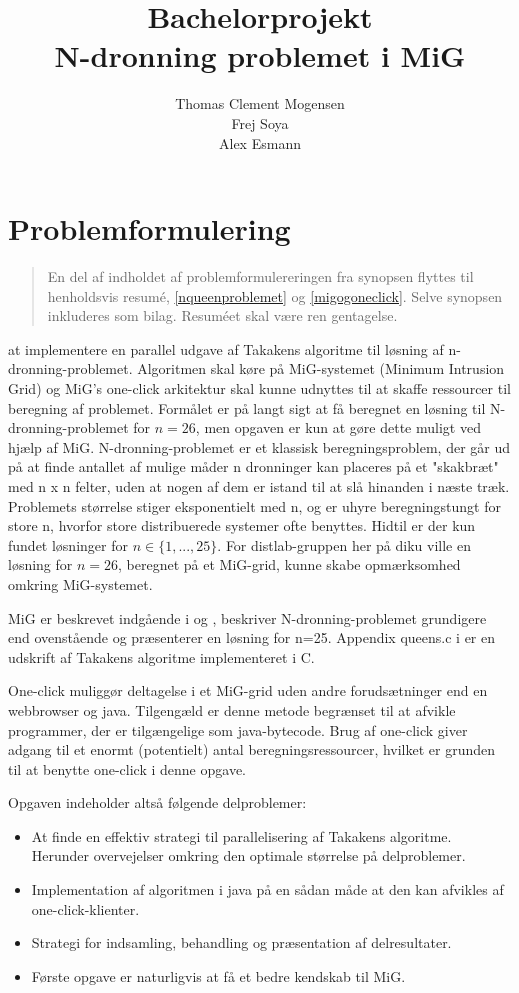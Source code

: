 \documentclass[a4,10pt]{article}
\title{Bachelorprojekt\\N-dronning problemet i MiG}
\author{Thomas Clement Mogensen \\ Frej Soya \\ Alex Esmann }
\begin{document}
\maketitle
\tableofcontents

\tableofcontents

\abstract{}

\section{Problemformulering}\label{problemformulering}
\begin{verse}
	En del af indholdet af problemformulereringen fra synopsen flyttes til henholdsvis resumé, \ref{nqueenproblemet} og \ref{migogoneclick}. Selve synopsen inkluderes som bilag. Resuméet skal være ren gentagelse.
\end{verse}
%
at implementere en parallel udgave af Takakens algoritme til løsning af n-dronning-problemet. Algoritmen skal køre på MiG-systemet (Minimum Intrusion Grid) og MiG's one-click arkitektur skal kunne udnyttes til at skaffe ressourcer til beregning af problemet. Formålet er på langt sigt at få beregnet en løsning til N-dronning-problemet for $n=26$, men opgaven er kun at gøre dette muligt ved hjælp af MiG. N-dronning-problemet er et klassisk beregningsproblem, der går ud på at finde antallet af mulige måder n dronninger kan placeres på et "skakbræt" med n x n felter, uden at nogen af dem er istand til at slå hinanden i næste træk. Problemets størrelse stiger eksponentielt med n, og er uhyre beregningstungt for store n, hvorfor store distribuerede systemer ofte benyttes. Hidtil er der kun fundet løsninger for $n \in \{1,...,25\}$. For distlab-gruppen her på diku ville en løsning for $n=26$, beregnet på et MiG-grid, kunne skabe opmærksomhed omkring MiG-systemet.

MiG er beskrevet indgående i \cite{simplemig} og \cite{mig}, \cite{etsi} beskriver N-dronning-problemet grundigere end ovenstående og præsenterer en løsning for n=25. Appendix queens.c i \cite{etsi} er en udskrift af Takakens algoritme implementeret i C.

One-click muliggør deltagelse i et MiG-grid uden andre forudsætninger end en webbrowser og java. Tilgengæld er denne metode begrænset til at afvikle programmer, der er tilgængelige som java-bytecode. Brug af one-click giver adgang til et enormt (potentielt) antal beregningsressourcer, hvilket er grunden til at benytte one-click i denne opgave.

Opgaven indeholder altså følgende delproblemer:
\begin{itemize}
\item At finde en effektiv strategi til parallelisering af Takakens algoritme. Herunder overvejelser omkring den optimale størrelse på delproblemer.
\item Implementation af algoritmen i java på en sådan måde at den kan afvikles af one-click-klienter.
\item Strategi for indsamling, behandling og præsentation af delresultater.
\item Første opgave er naturligvis at få et bedre kendskab til MiG.
\end{itemize}
\end{document}
